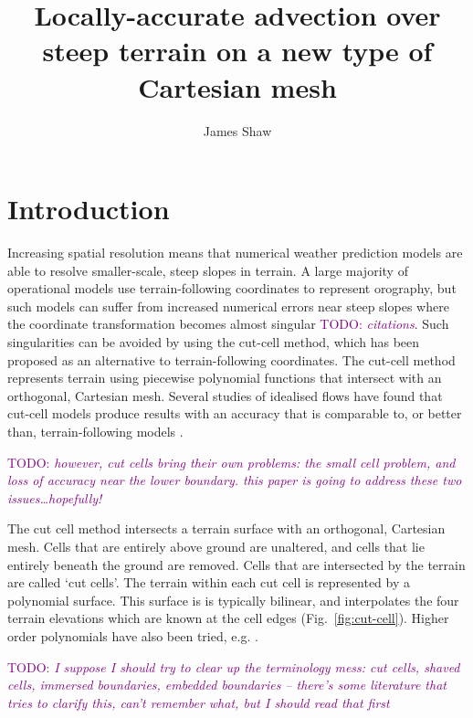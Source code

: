 \documentclass{article}
\title{Locally-accurate advection over steep terrain on a new type of Cartesian mesh \\ \TODO{(working title)}}
\author{James Shaw}
\newcommand{\TODO}[1]{\textcolor{purple}{TODO: \emph{#1}}}
\begin{document}
\maketitle

\section{Introduction}

Increasing spatial resolution means that numerical weather prediction models are able to resolve smaller-scale, steep slopes in terrain.  A large majority of operational models use terrain-following coordinates to represent orography, but such models can suffer from increased numerical errors near steep slopes where the coordinate transformation becomes almost singular \TODO{citations}.  Such singularities can be avoided by using the cut-cell method, which has been proposed as an alternative to terrain-following coordinates.  The cut-cell method represents terrain using piecewise polynomial functions that intersect with an orthogonal, Cartesian mesh.  Several studies of idealised flows have found that cut-cell models produce results with an accuracy that is comparable to, or better than, terrain-following models \citep{yamazaki-satomura2008,good2014,shaw-weller2016}.

\TODO{however, cut cells bring their own problems: the small cell problem, and loss of accuracy near the lower boundary.  this paper is going to address these two issues\ldots hopefully!}


The cut cell method intersects a terrain surface with an orthogonal, Cartesian mesh.
Cells that are entirely above ground are unaltered, and cells that lie entirely beneath the ground are removed.
Cells that are intersected by the terrain are called `cut cells'.  The terrain within each cut cell is represented by a polynomial surface.  This surface is is typically bilinear, and interpolates the four terrain elevations which are known at the cell edges (Fig.~\ref{fig:cut-cell}).  Higher order polynomials have also been tried, e.g. \citet{kirkpatrick2003}.

\TODO{I suppose I should try to clear up the terminology mess: cut cells, shaved cells, immersed boundaries, embedded boundaries -- there's some literature that tries to clarify this, can't remember what, but I should read that first}
\end{document}
